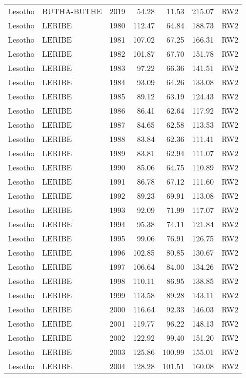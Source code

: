 \begin{longtable}{lllrrrl}
  Lesotho & BUTHA-BUTHE & 2019 & 54.28 & 11.53 & 215.07 & RW2 \\ 
  Lesotho & LERIBE & 1980 & 112.47 & 64.84 & 188.73 & RW2 \\ 
  Lesotho & LERIBE & 1981 & 107.02 & 67.25 & 166.31 & RW2 \\ 
  Lesotho & LERIBE & 1982 & 101.87 & 67.70 & 151.78 & RW2 \\ 
  Lesotho & LERIBE & 1983 & 97.22 & 66.36 & 141.51 & RW2 \\ 
  Lesotho & LERIBE & 1984 & 93.09 & 64.26 & 133.08 & RW2 \\ 
  Lesotho & LERIBE & 1985 & 89.12 & 63.19 & 124.43 & RW2 \\ 
  Lesotho & LERIBE & 1986 & 86.41 & 62.64 & 117.92 & RW2 \\ 
  Lesotho & LERIBE & 1987 & 84.65 & 62.58 & 113.53 & RW2 \\ 
  Lesotho & LERIBE & 1988 & 83.84 & 62.36 & 111.41 & RW2 \\ 
  Lesotho & LERIBE & 1989 & 83.81 & 62.94 & 111.07 & RW2 \\ 
  Lesotho & LERIBE & 1990 & 85.06 & 64.75 & 110.89 & RW2 \\ 
  Lesotho & LERIBE & 1991 & 86.78 & 67.12 & 111.60 & RW2 \\ 
  Lesotho & LERIBE & 1992 & 89.23 & 69.91 & 113.08 & RW2 \\ 
  Lesotho & LERIBE & 1993 & 92.09 & 71.99 & 117.07 & RW2 \\ 
  Lesotho & LERIBE & 1994 & 95.38 & 74.11 & 121.84 & RW2 \\ 
  Lesotho & LERIBE & 1995 & 99.06 & 76.91 & 126.75 & RW2 \\ 
  Lesotho & LERIBE & 1996 & 102.85 & 80.85 & 130.67 & RW2 \\ 
  Lesotho & LERIBE & 1997 & 106.64 & 84.00 & 134.26 & RW2 \\ 
  Lesotho & LERIBE & 1998 & 110.11 & 86.95 & 138.85 & RW2 \\ 
  Lesotho & LERIBE & 1999 & 113.58 & 89.28 & 143.11 & RW2 \\ 
  Lesotho & LERIBE & 2000 & 116.64 & 92.33 & 146.03 & RW2 \\ 
  Lesotho & LERIBE & 2001 & 119.77 & 96.22 & 148.13 & RW2 \\ 
  Lesotho & LERIBE & 2002 & 122.92 & 99.40 & 151.20 & RW2 \\ 
  Lesotho & LERIBE & 2003 & 125.86 & 100.99 & 155.01 & RW2 \\ 
  Lesotho & LERIBE & 2004 & 128.28 & 101.51 & 160.08 & RW2 \\ 

\end{longtable}
